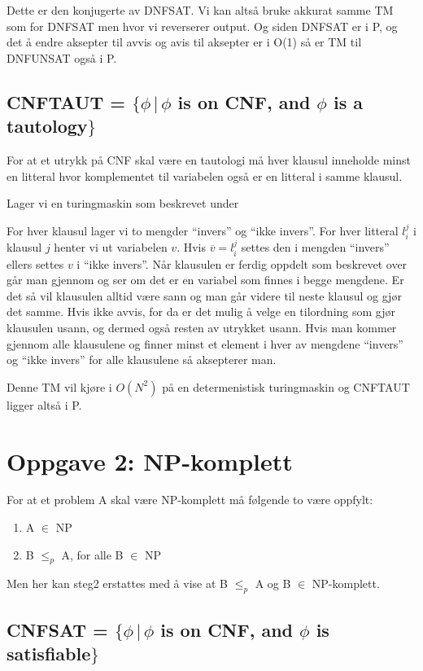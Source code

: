 \documentclass{article}
\begin{document}
Dette er den konjugerte av DNFSAT. Vi kan altså bruke akkurat samme TM som for DNFSAT men hvor vi reverserer output. Og siden DNFSAT er i P, og det å endre aksepter til avvis og avis til aksepter er i O(1) så er TM til DNFUNSAT også i P.




\subsection*{CNFTAUT = $\{\phi \, |  \, \phi $ is on CNF, and $\phi$ is a tautology$\}$}
For at et utrykk på CNF skal være en tautologi må hver klausul inneholde minst en litteral hvor komplementet til variabelen også er en litteral i samme klausul.

Lager vi en turingmaskin som beskrevet under

For hver klausul lager vi to mengder ``invers''  og ``ikke invers''. For hver litteral $l_i^j$ i klausul $j$ henter vi ut variabelen $v$. Hvis $\overline{v} = l_i^j$ settes den i mengden ``invers'' ellers settes $v$ i  ``ikke invers''. Når klausulen er ferdig oppdelt som beskrevet over går man gjennom og ser om det er en variabel som finnes i begge mengdene. Er det så vil klausulen alltid være sann og man går videre til neste klausul og gjør det samme. Hvis ikke avvis, for da er det mulig å velge en tilordning som gjør klausulen usann, og dermed også resten av utrykket usann.
Hvis man kommer gjennom alle klausulene og finner minst et element i hver av mengdene ``invers'' og ``ikke invers'' for alle klausulene så aksepterer man.

Denne TM vil kjøre i $O(N^2)$ på en determenistisk turingmaskin og CNFTAUT ligger altså i P.




\section*{Oppgave 2: NP-komplett}
For at et problem A skal være NP-komplett må følgende to være oppfylt:
\begin{enumerate}
\item A $\in $ NP
\item B $\leq_p $ A, \quad for alle B $\in$ NP
\end{enumerate}

Men her kan steg2 erstattes med å vise at B $\leq_p $ A og B $\in$ NP-komplett.

\subsection*{CNFSAT = $\{\phi \, |  \, \phi $ is on CNF, and $\phi$ is satisfiable$\}$}
\end{document}
